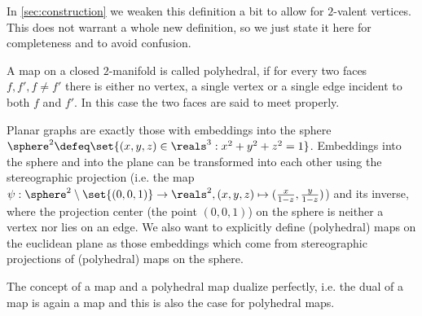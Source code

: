 \begin{remark}
  In \autoref{sec:construction} we weaken this definition a bit to allow for $2$-valent vertices. This does not warrant a whole new definition, so we just state it here for completeness and to avoid confusion.
\end{remark}

\begin{definition} \label{def:polymap} A map on a closed $2$-manifold is called polyhedral, if for every two faces $f, f', f \neq f'$ there is either no vertex, a single vertex or a single edge incident to both $f$ and $f'$. In this case the two faces are said to meet properly.
\end{definition}

\begin{remark} Planar graphs are exactly those with embeddings into the sphere $\sphere^2 \defeq \set{(x, y, z) \in \reals^3 : x^2 + y^2 + z^2 = 1}$. Embeddings into the sphere and into the plane can be transformed into each other using the stereographic projection (i.e. the map $\psi: \sphere^2 \setminus \set{(0, 0, 1)} \to \reals^2, (x, y, z) \mapsto (\frac{x}{1-z}, \frac{y}{1-z})$) and its inverse, where the projection center (the point $(0, 0, 1)$) on the sphere is neither a vertex nor lies on an edge. We also want to explicitly define (polyhedral) maps on the euclidean plane as those embeddings which come from stereographic projections of (polyhedral) maps on the sphere.
\end{remark}

\begin{remark}
  The concept of a map and a polyhedral map dualize perfectly, i.e. the dual of a map is again a map and this is also the case for polyhedral maps.
\end{remark}


